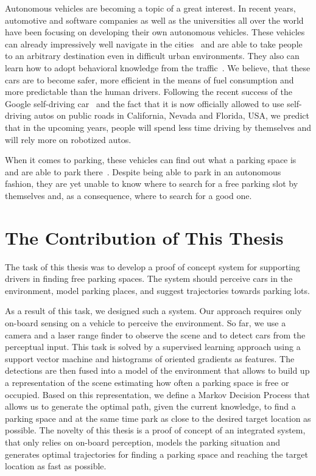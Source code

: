 Autonomous vehicles are becoming a topic of a great interest. In recent years,
automotive and software companies as well as the universities all over the
world have been focusing on developing their own autonomous vehicles. These
vehicles can already impressively well navigate in the
cities~\cite{stanley_auto_car,perceprion_drivec_car,lima13,daimler} and are
able to take people to an arbitrary destination even in difficult urban
environments. They also can learn how to adopt behavioral knowledge from the
traffic~\cite{behaviour_learning,spinello10:multiclass}. We believe, that
these cars are to become safer, more efficient in the means of fuel
consumption and more predictable than the human drivers. Following the recent
success of the Google self-driving car~\cite{markoff2010google} and the fact
that it is now officially allowed to use self-driving autos on public roads in
California, Nevada and Florida, USA, we predict that in the upcoming years,
people will spend less time driving by themselves and will rely more on
robotized autos.

When it comes to parking, these vehicles can find out what a parking space is
and are able to park
there~\cite{auto_cars_burgard,auto_parking09,auto_park2_11}. Despite being
able to park in an autonomous fashion, they are yet unable to know where to
search for a free parking slot by themselves and, as a consequence, where to
search for a good one.

\section*{The Contribution of This Thesis} %
\label{sec:the_contribution_of_this_thesis}

    The task of this thesis was to develop a proof of concept system for
    supporting drivers in finding free parking spaces. The system should
    perceive cars in the environment, model parking places, and suggest
    trajectories towards parking lots.

    As a result of this task, we designed such a system. Our approach requires
    only on-board sensing on a vehicle to perceive the environment. So far, we
    use a camera and a laser range finder to observe the scene and to detect
    cars from the perceptual input. This task is solved by a supervised
    learning approach using a support vector machine and histograms of
    oriented gradients as features. The detections are then fused into a model
    of the environment that allows to build up a representation of the scene
    estimating how often a parking space is free or occupied.  Based on this
    representation, we define a Markov Decision Process that allows us to
    generate the optimal path, given the current knowledge, to find a parking
    space and at the same time park as close to the desired target location as
    possible. The novelty of this thesis is a proof of concept of an
    integrated system, that only relies on on-board perception, models the
    parking situation and generates optimal trajectories for finding a parking
    space and reaching the target location as fast as possible.


